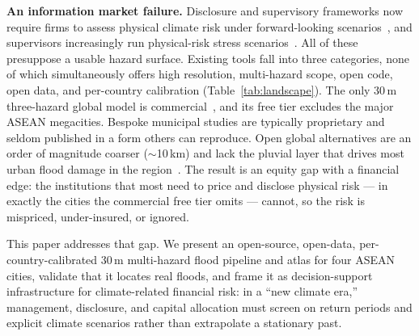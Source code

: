 \documentclass[11pt,a4paper]{article}
\begin{document}
\textbf{An information market failure.} Disclosure and supervisory frameworks now require firms to assess physical climate risk under forward-looking scenarios~\cite{tcfd2017,issb2023}, and supervisors increasingly run physical-risk stress scenarios~\cite{ngfs2021}. All of these presuppose a usable hazard surface. Existing tools fall into three categories, none of which simultaneously offers high resolution, multi-hazard scope, open code, open data, and per-country calibration (Table~\ref{tab:landscape}). The only 30\,m three-hazard global model is commercial~\cite{wing2024}, and its free tier excludes the major ASEAN megacities. Bespoke municipal studies are typically proprietary and seldom published in a form others can reproduce. Open global alternatives are an order of magnitude coarser ($\sim$10\,km) and lack the pluvial layer that drives most urban flood damage in the region~\cite{hofste2019,ward2020,sutanudjaja2018}. The result is an equity gap with a financial edge: the institutions that most need to price and disclose physical risk --- in exactly the cities the commercial free tier omits --- cannot, so the risk is mispriced, under-insured, or ignored.

This paper addresses that gap. We present an open-source, open-data, per-country-calibrated 30\,m multi-hazard flood pipeline and atlas for four ASEAN cities, validate that it locates real floods, and frame it as decision-support infrastructure for climate-related financial risk: in a ``new climate era,'' management, disclosure, and capital allocation must screen on return periods and explicit climate scenarios rather than extrapolate a stationary past.
\end{document}
